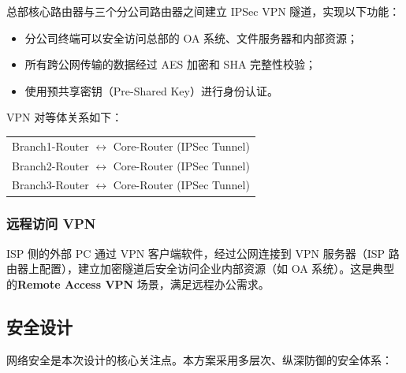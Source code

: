 \documentclass[12pt,a4paper]{ctexart}
\begin{document}
总部核心路由器与三个分公司路由器之间建立 IPSec VPN 隧道，实现以下功能：
\begin{itemize}
    \item 分公司终端可以安全访问总部的 OA 系统、文件服务器和内部资源；
    \item 所有跨公网传输的数据经过 AES 加密和 SHA 完整性校验；
    \item 使用预共享密钥（Pre-Shared Key）进行身份认证。
\end{itemize}

VPN 对等体关系如下：

\begin{center}
\begin{tabular}{c}
Branch1-Router $\longleftrightarrow$ Core-Router (IPSec Tunnel) \\
Branch2-Router $\longleftrightarrow$ Core-Router (IPSec Tunnel) \\
Branch3-Router $\longleftrightarrow$ Core-Router (IPSec Tunnel) \\
\end{tabular}
\end{center}

\subsubsection{远程访问 VPN}

ISP 侧的外部 PC 通过 VPN 客户端软件，经过公网连接到 VPN 服务器（ISP 路由器上配置），建立加密隧道后安全访问企业内部资源（如 OA 系统）。这是典型的\textbf{Remote Access VPN} 场景，满足远程办公需求。


\subsection{安全设计}

网络安全是本次设计的核心关注点。本方案采用多层次、纵深防御的安全体系：
\end{document}
